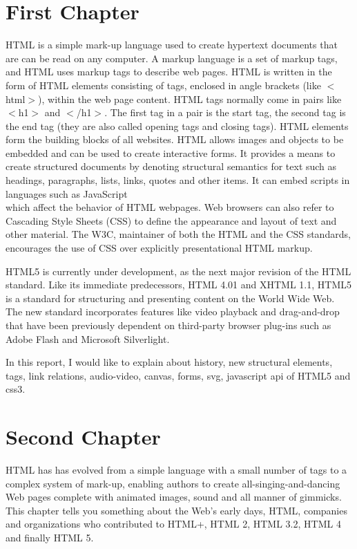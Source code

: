 \documentclass[12pt,a4paper]{report}
\begin{document}
\chapter{First Chapter}
HTML is a simple mark-up language used to create hypertext documents that are can be read on any computer.
A markup language is a set of markup tags, and HTML uses markup tags to describe web pages.
HTML is written in the form of HTML elements consisting of tags, enclosed in angle brackets
(like $<$html$>$), 
within the web page content. HTML tags normally come in pairs like $<$h1$>$ and $<$/h1$>$. 
The first tag in a pair is the start tag, the second tag is the end tag (they are also called opening tags and closing tags).
HTML elements form the building blocks of all websites. 
HTML allows images and objects to be embedded and can be used to create interactive forms. 
It provides a means to create structured documents by denoting structural semantics for text such as headings, 
paragraphs, lists, links, quotes and other items. It can embed scripts in languages such as 
JavaScript \\ which affect the behavior of HTML webpages.
Web browsers can also refer to Cascading Style Sheets (CSS) to define the appearance and layout 
of text and other material. The W3C, maintainer of both the HTML and the CSS standards, encourages 
the use of CSS over explicitly presentational HTML markup.

HTML5 is currently under development, as the next major revision of the HTML standard. Like its immediate predecessors, 
HTML 4.01 and XHTML 1.1, HTML5 is a standard for structuring and presenting content on the World Wide Web.
The new standard incorporates features like video playback and drag-and-drop that have been previously dependent 
on third-party browser plug-ins such as Adobe Flash and Microsoft Silverlight.

In this report, I would like to explain about history, new structural elements, tags, 
link relations, audio-video, canvas, forms, svg, javascript api of HTML5 and css3.


\chapter{Second Chapter}
HTML has has evolved from a simple language with a small number of tags to a complex system of mark-up, 
enabling authors to create all-singing-and-dancing Web pages complete with animated images, sound and all manner of gimmicks. 
This chapter tells you something about the Web's early days, HTML, companies and organizations 
who contributed to HTML+, HTML 2, HTML 3.2, HTML 4 and finally HTML 5.
\end{document}
